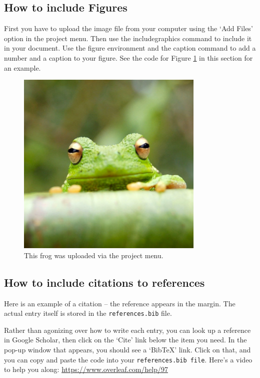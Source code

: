 \documentclass{tufte-handout}
\begin{document}
\subsection{How to include Figures}

First you have to upload the image file from your computer using the `Add Files' option in the project menu. Then use the includegraphics command to include it in your document. Use the figure environment and the caption command to add a number and a caption to your figure. See the code for Figure \ref{fig:frog} in this section for an example.

\begin{figure}
\centering
\includegraphics[width=0.8\textwidth]{frog.jpg}
\caption{\label{fig:frog}This frog was uploaded via the project menu.}
\end{figure}

\subsection{How to include citations to  references}

Here is an example of a citation\cite{tufte1983visual} -- the reference appears in the margin. The actual entry itself is stored in the \texttt{references.bib} file. 

Rather than agonizing over how to write each entry, you can look up a reference in Google Scholar, then click on the `Cite' link below the item you need. In the pop-up window that appears, you should see a `BibTeX' link. Click on that, and you can copy and paste the code into your \texttt{references.bib file}. Here's a video to help you along: \url{https://www.overleaf.com/help/97}
\end{document}

